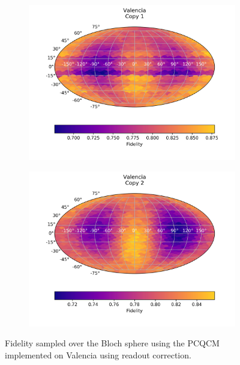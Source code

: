 \begin{figure}[H]
  \centering
  \begin{subfigure}{.5\textwidth}
    \centering
    \includegraphics[width=\textwidth]{Figures/PhaseCovariant/IBM/FullSphere/results_corrected_valencia_copy1.png}
    \label{fig:pc_corrected_valencia_sphere_1}
  \end{subfigure}%
  \begin{subfigure}{.5\textwidth}
    \centering
    \includegraphics[width=\textwidth]{Figures/PhaseCovariant/IBM/FullSphere/results_corrected_valencia_copy2.png}
    \label{fig:pc_corrected_valencia_sphere_2}
  \end{subfigure}
  \caption{Fidelity sampled over the Bloch sphere using the PCQCM implemented on Valencia using readout correction.}
  \label{fig:pc_corrected_valencia_sphere}
\end{figure}


